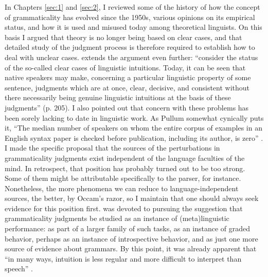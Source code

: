  In Chapters \ref{sec:1} and \ref{sec:2}, I reviewed some of the history of how the concept of grammaticality has evolved since the 1950s, various opinions on its empirical status, and how it is used and misused today among theoretical linguists. On this basis I argued that theory is no longer being based on clear cases, and that detailed study of the judgment process is therefore required to establish how to deal with unclear cases. \citet{Botha1973} extends the argument even further: ``consider the status of the so-called clear cases of linguistic intuitions. Today, it can be seen that
 native speakers may make, concerning a particular linguistic property of some sentence, judgments which are at once, clear, decisive, and consistent without there necessarily being genuine linguistic intuitions at the basis of these judgments'' (p. 205). I also pointed out that concern with these problems has been sorely lacking to date in linguistic work. As Pullum somewhat cynically puts it, ``The median number of speakers on whom the entire corpus of examples in an English syntax paper is checked before publication, including its author, is zero'' \citep[453]{Pullum1987}. I made the specific proposal that the sources of the perturbations in grammaticality judgments exist independent of the language faculties of the mind. In retrospect, that position has probably turned out to be too strong. Some of them might be attributable specifically to the parser, for instance. Nonetheless, the more phenomena we can reduce to language-independent sources, the better, by Occam's razor, so I maintain that one should always seek evidence for this position first.  was devoted to pursuing the suggestion that grammaticality judgments be studied as an instance of (meta)linguistic performance: as part of a larger family of such tasks, as an instance of graded behavior, perhaps as an instance of introspective behavior, and as just one more source of evidence about grammars. By this point, it was already apparent that ``in many ways, intuition is less regular and more difficult to interpret than speech'' \citep[199]{Labov1972a}.

